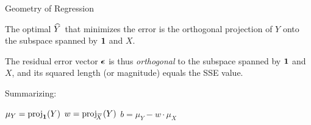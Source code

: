 %
\begin{frame}{Geometry of Regression}
	
The optimal $\mkern 1.5mu\widehat{\mkern-1.5muY}\mkern 1.5mu$ that minimizes the error is 
the orthogonal projection of
$Y$ onto the subspace spanned by $\mathbf{1}$ and $X$.

\medskip


The residual error vector ${\bm \epsilon}$ is thus {\em orthogonal} to the subspace spanned by $\mathbf{1}$
and $X$, and its squared length (or magnitude) equals the SSE value.

\medskip

	Summarizing: 

	\medskip

	$\mu_Y = \operatorname{proj}_{\mathbf{1}}(Y)$ \hspace*{1cm} $w = \operatorname{proj}_{\mkern 1.5mu\overline{\mkern-4.0muX}\mkern 1.5mu}(Y)$ \hspace*{1cm} $b = \mu_Y - w \cdot \mu_X$ 

\medskip


\end{frame}
